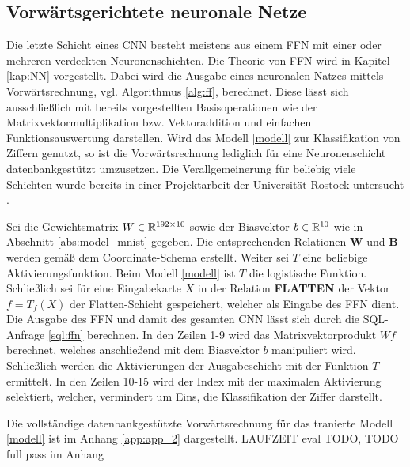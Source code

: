 \subsection*{Vorwärtsgerichtete neuronale Netze}
Die letzte Schicht eines CNN besteht meistens aus einem FFN mit einer oder mehreren verdeckten Neuronenschichten. Die Theorie von FFN wird in Kapitel \ref{kap:NN} vorgestellt. Dabei wird die Ausgabe eines neuronalen Natzes mittels Vorwärtsrechnung, vgl. Algorithmus \ref{alg:ff}, berechnet. Diese lässt sich ausschließlich mit bereits vorgestellten Basisoperationen wie der Matrixvektormultiplikation bzw. Vektoraddition und einfachen Funktionsauswertung darstellen. Wird das Modell \ref{modell} zur Klassifikation von Ziffern genutzt, so ist die Vorwärtsrechnung lediglich für eine Neuronenschicht datenbankgestützt umzusetzen. Die Verallgemeinerung für beliebig viele Schichten wurde bereits in einer Projektarbeit der Universität Rostock untersucht \cite{myprojekt}. 

Sei die Gewichtsmatrix $W \in \mathbb{R}^{192 \times 10}$ sowie der Biasvektor $b \in \mathbb{R}^{10}$ wie in Abschnitt \ref{abs:model_mnist} gegeben. Die entsprechenden Relationen \textbf{W} und \textbf{B} werden gemäß dem Coordinate-Schema erstellt. Weiter sei $T$ eine beliebige Aktivierungsfunktion. Beim Modell \ref{modell} ist $T$ die logistische Funktion. Schließlich sei für eine Eingabekarte $X$ in der Relation \textbf{FLATTEN} der Vektor $f=T_f(X)$ der Flatten-Schicht gespeichert, welcher als Eingabe des FFN dient. Die Ausgabe des FFN und damit des gesamten CNN lässt sich durch die SQL-Anfrage \ref{sql:ffn} berechnen. In den Zeilen 1-9 wird das Matrixvektorprodukt $Wf$ berechnet, welches anschließend mit dem Biasvektor $b$ manipuliert wird. Schließlich werden die Aktivierungen der Ausgabeschicht mit der Funktion $T$ ermittelt. In den Zeilen 10-15 wird der Index mit der maximalen Aktivierung selektiert, welcher, vermindert um Eins, die Klassifikation der Ziffer darstellt.



Die vollständige datenbankgestützte Vorwärtsrechnung für das tranierte Modell \ref{modell} ist im Anhang \ref{app:app_2} dargestellt. LAUFZEIT eval TODO, TODO full pass im Anhang
